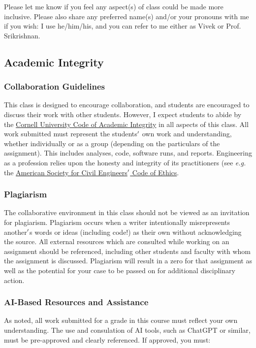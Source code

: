 \documentclass[12pt,a4paper]{article}
\begin{document}
Please let me know if you feel any aspect(s) of class could be made more inclusive. Please also share any preferred name(s) and/or your pronouns with me if you wish: I use he/him/his, and you can refer to me either as Vivek or Prof. Srikrishnan.

\subsection{Academic Integrity}
\subsubsection{Collaboration Guidelines}
This class is designed to encourage collaboration, and students are encouraged to discuss their work with other students. However, I expect students to abide by the \href{http://theuniversityfaculty.cornell.edu/academic-integrity/}{Cornell University Code of Academic Integrity} in all aspects of this class. All work submitted must represent the students\ensuremath{\rq} own work and understanding, whether individually or as a group (depending on the particulars of the assignment). This includes analyses, code, software runs, and reports. Engineering as a profession relies upon the honesty and integrity of its practitioners (see \emph{e.g.} the \href{https://www.asce.org/-/media/asce-images-and-files/career-and-growth/ethics/documents/asce-code-ethics.pdf}{American Society for Civil Engineers\ensuremath{\rq} Code of Ethics}.

\subsubsection{Plagiarism}
The collaborative environment in this class should not be viewed as an invitation for plagiarism. Plagiarism occurs when a writer intentionally misrepresents another\ensuremath{\rq}s words or ideas (including code!) as their own without acknowledging the source. All external resources which are consulted while working on an assignment should be referenced, including other students and faculty with whom the assignment is discussed. Plagiarism will result in a zero for that assignment as well as the potential for your case to be passed on for additional disciplinary action.

\subsubsection{AI-Based Resources and Assistance}
As noted, all work submitted for a grade in this course must reflect your own understanding. The use and consulation of AI tools, such as ChatGPT or similar, must be pre-approved and clearly referenced. If approved, you must: 
\end{document}
